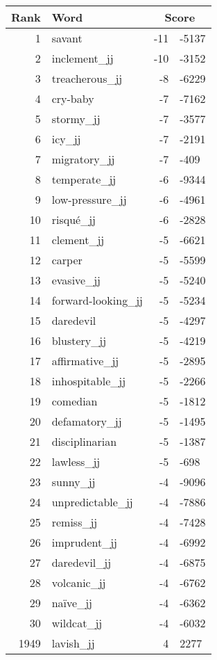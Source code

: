 \begin{longtable}[!htbp]{| rlr@{.}l |}
    \hline
    \textbf{Rank} & \textbf{Word} & \multicolumn{2}{c|}{\textbf{Score}} \\
    \hline
    \endhead
    1 & savant & -11 & -5137 \\
    2 & inclement\_jj & -10 & -3152 \\
    3 & treacherous\_jj & -8 & -6229 \\
    4 & cry-baby & -7 & -7162 \\
    5 & stormy\_jj & -7 & -3577 \\
    6 & icy\_jj & -7 & -2191 \\
    7 & migratory\_jj & -7 & -409 \\
    8 & temperate\_jj & -6 & -9344 \\
    9 & low-pressure\_jj & -6 & -4961 \\
    10 & risqué\_jj & -6 & -2828 \\
    11 & clement\_jj & -5 & -6621 \\
    12 & carper & -5 & -5599 \\
    13 & evasive\_jj & -5 & -5240 \\
    14 & forward-looking\_jj & -5 & -5234 \\
    15 & daredevil & -5 & -4297 \\
    16 & blustery\_jj & -5 & -4219 \\
    17 & affirmative\_jj & -5 & -2895 \\
    18 & inhospitable\_jj & -5 & -2266 \\
    19 & comedian & -5 & -1812 \\
    20 & defamatory\_jj & -5 & -1495 \\
    21 & disciplinarian & -5 & -1387 \\
    22 & lawless\_jj & -5 & -698 \\
    23 & sunny\_jj & -4 & -9096 \\
    24 & unpredictable\_jj & -4 & -7886 \\
    25 & remiss\_jj & -4 & -7428 \\
    26 & imprudent\_jj & -4 & -6992 \\
    27 & daredevil\_jj & -4 & -6875 \\
    28 & volcanic\_jj & -4 & -6762 \\
    29 & naïve\_jj & -4 & -6362 \\
    30 & wildcat\_jj & -4 & -6032 \\
    1949 & lavish\_jj & 4 & 2277 \\

\end{longtable}
